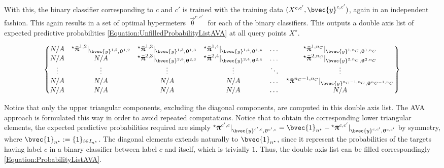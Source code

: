 				With this, the binary classifier corresponding to $c$ and $c'$ is trained with the training data $(X^{c, c'}, \bvec{y}^{c, c'})$, again in an independent fashion. This again results in a set of optimal hypermeters $\vec{\uptheta}^{c, c'}$ for each of the binary classifiers. This outputs a double axis list of expected predictive probabilities \eqref{Equation:UnfilledProbabilityListAVA} at all query points $X^{\star}$.
				
				\begin{equation}
					\begin{Bmatrix*}
						N/A & {^{\star}}\bar{\vec{\uppi}}^{1, 2} |_{\bvec{y}^{1, 2}, \vec{\uptheta}^{1, 2}} & {^{\star}}\bar{\vec{\uppi}}^{1, 3} |_{\bvec{y}^{1, 3}, \vec{\uptheta}^{1, 3}} & {^{\star}}\bar{\vec{\uppi}}^{1, 4} |_{\bvec{y}^{1, 4}, \vec{\uptheta}^{1, 4}} & \dots & {^{\star}}\bar{\vec{\uppi}}^{1, n_{C}} |_{\bvec{y}^{1, n_{C}}, \vec{\uptheta}^{1, n_{C}}} \\
						N/A & N/A & {^{\star}}\bar{\vec{\uppi}}^{2, 3} |_{\bvec{y}^{2, 3}, \vec{\uptheta}^{2, 3}} & {^{\star}}\bar{\vec{\uppi}}^{2, 4} |_{\bvec{y}^{2, 4}, \vec{\uptheta}^{2, 4}} & \dots & {^{\star}}\bar{\vec{\uppi}}^{2, n_{C}} |_{\bvec{y}^{2, n_{C}}, \vec{\uptheta}^{2, n_{C}}} \\
						\vdots & \vdots & \vdots & \vdots & \ddots & \vdots \\
						N/A & N/A & N/A & N/A & \dots & {^{\star}}\bar{\vec{\uppi}}^{n_{C} - 1, n_{C}} |_{\bvec{y}^{n_{C} - 1, n_{C}}, \vec{\uptheta}^{n_{C} - 1, n_{C}}} \\
						N/A & N/A & N/A & N/A & \dots & N/A
					\end{Bmatrix*} 
				\label{Equation:UnfilledProbabilityListAVA}
				\end{equation}				
							
				Notice that only the upper triangular components, excluding the diagonal components, are computed in this double axis list. The AVA approach is formulated this way in order to avoid repeated computations. Notice that to obtain the corresponding lower triangular elements, the expected predictive probabilities required are simply ${^{\star}}\bar{\vec{\uppi}}^{c', c} |_{\bvec{y}^{c', c}, \vec{\uptheta}^{c', c}} = \bvec{1}_{n^{\star}} - {^{\star}}\bar{\vec{\uppi}}^{c, c'} |_{\bvec{y}^{c, c'}, \vec{\uptheta}^{c, c'}}$ by symmetry, where $\bvec{1}_{n^{\star}} := \{1\}_{i \in I_{n^{\star}}}$. The diagonal elements extends naturally to $\bvec{1}_{n^{\star}}$, since it represent the probabilities of the targets having label $c$ in a binary classifier between label $c$ and itself, which is trivially $1$. Thus, the double axis list can be filled correspondingly \eqref{Equation:ProbabilityListAVA}.
				
